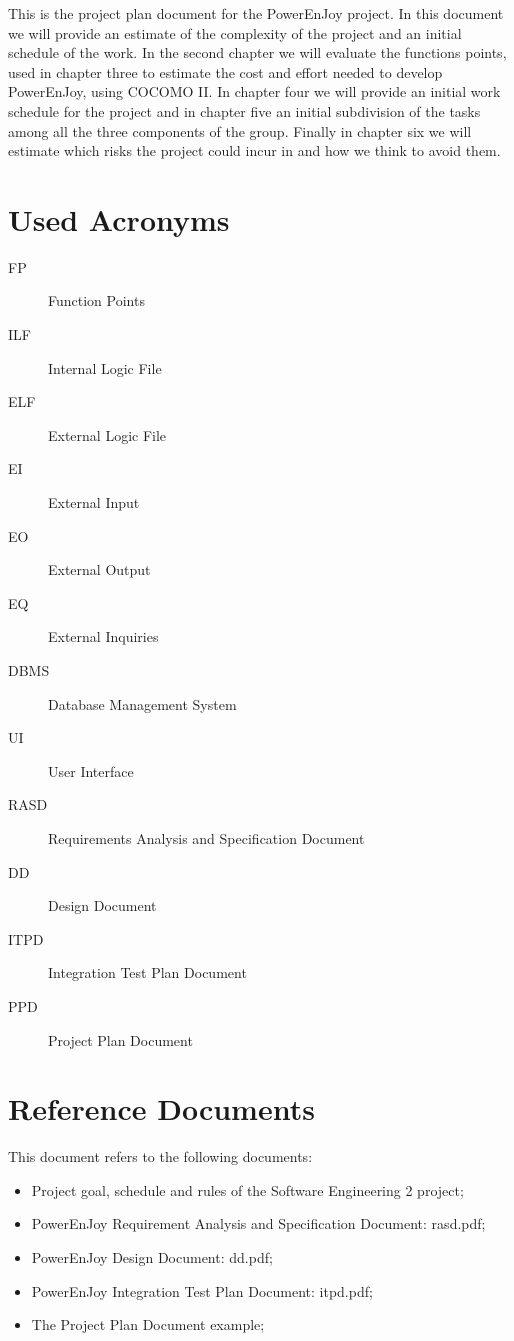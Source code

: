 This is the project plan document for the PowerEnJoy project. In this document we will provide an estimate of the complexity of the project and an initial schedule of the work. In the second chapter we will evaluate the functions points, used in chapter three to estimate the cost and effort needed to develop PowerEnJoy, using COCOMO II. In chapter four we will provide an initial work schedule for the project and in chapter five an initial subdivision of the tasks among all the three components of the group. Finally in chapter six we will estimate which risks the project could incur in and how we think to avoid them. 

\section{Used Acronyms}
\begin{description}
\item[FP] Function Points
\item[ILF] Internal Logic File
\item[ELF] External Logic File
\item[EI] External Input
\item[EO] External Output
\item[EQ] External Inquiries
\item[DBMS] Database Management System
\item[UI] User Interface
\item[RASD] Requirements Analysis and Specification Document
\item[DD] Design Document
\item[ITPD] Integration Test Plan Document
\item[PPD] Project Plan Document
\end{description}

\section{Reference Documents}
This document refers to the following documents:
\begin{itemize}
\item Project goal, schedule and rules of the Software Engineering 2 project;
\item PowerEnJoy Requirement Analysis and Specification Document: rasd.pdf;
\item PowerEnJoy Design Document: dd.pdf;
\item PowerEnJoy Integration Test Plan Document: itpd.pdf;
\item The Project Plan Document example;
\end{itemize}